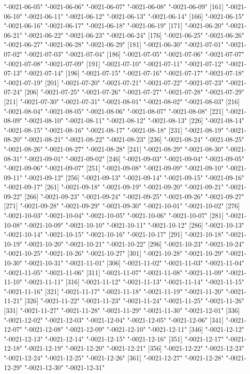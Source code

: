 \documentclass[
]{jss}
\begin{document}
\begin{CodeChunk}
\begin{CodeOutput}
[156] "-0021-06-05" "-0021-06-06" "-0021-06-07" "-0021-06-08" "-0021-06-09"
[161] "-0021-06-10" "-0021-06-11" "-0021-06-12" "-0021-06-13" "-0021-06-14"
[166] "-0021-06-15" "-0021-06-16" "-0021-06-17" "-0021-06-18" "-0021-06-19"
[171] "-0021-06-20" "-0021-06-21" "-0021-06-22" "-0021-06-23" "-0021-06-24"
[176] "-0021-06-25" "-0021-06-26" "-0021-06-27" "-0021-06-28" "-0021-06-29"
[181] "-0021-06-30" "-0021-07-01" "-0021-07-02" "-0021-07-03" "-0021-07-04"
[186] "-0021-07-05" "-0021-07-06" "-0021-07-07" "-0021-07-08" "-0021-07-09"
[191] "-0021-07-10" "-0021-07-11" "-0021-07-12" "-0021-07-13" "-0021-07-14"
[196] "-0021-07-15" "-0021-07-16" "-0021-07-17" "-0021-07-18" "-0021-07-19"
[201] "-0021-07-20" "-0021-07-21" "-0021-07-22" "-0021-07-23" "-0021-07-24"
[206] "-0021-07-25" "-0021-07-26" "-0021-07-27" "-0021-07-28" "-0021-07-29"
[211] "-0021-07-30" "-0021-07-31" "-0021-08-01" "-0021-08-02" "-0021-08-03"
[216] "-0021-08-04" "-0021-08-05" "-0021-08-06" "-0021-08-07" "-0021-08-08"
[221] "-0021-08-09" "-0021-08-10" "-0021-08-11" "-0021-08-12" "-0021-08-13"
[226] "-0021-08-14" "-0021-08-15" "-0021-08-16" "-0021-08-17" "-0021-08-18"
[231] "-0021-08-19" "-0021-08-20" "-0021-08-21" "-0021-08-22" "-0021-08-23"
[236] "-0021-08-24" "-0021-08-25" "-0021-08-26" "-0021-08-27" "-0021-08-28"
[241] "-0021-08-29" "-0021-08-30" "-0021-08-31" "-0021-09-01" "-0021-09-02"
[246] "-0021-09-03" "-0021-09-04" "-0021-09-05" "-0021-09-06" "-0021-09-07"
[251] "-0021-09-08" "-0021-09-09" "-0021-09-10" "-0021-09-11" "-0021-09-12"
[256] "-0021-09-13" "-0021-09-14" "-0021-09-15" "-0021-09-16" "-0021-09-17"
[261] "-0021-09-18" "-0021-09-19" "-0021-09-20" "-0021-09-21" "-0021-09-22"
[266] "-0021-09-23" "-0021-09-24" "-0021-09-25" "-0021-09-26" "-0021-09-27"
[271] "-0021-09-28" "-0021-09-29" "-0021-09-30" "-0021-10-01" "-0021-10-02"
[276] "-0021-10-03" "-0021-10-04" "-0021-10-05" "-0021-10-06" "-0021-10-07"
[281] "-0021-10-08" "-0021-10-09" "-0021-10-10" "-0021-10-11" "-0021-10-12"
[286] "-0021-10-13" "-0021-10-14" "-0021-10-15" "-0021-10-16" "-0021-10-17"
[291] "-0021-10-18" "-0021-10-19" "-0021-10-20" "-0021-10-21" "-0021-10-22"
[296] "-0021-10-23" "-0021-10-24" "-0021-10-25" "-0021-10-26" "-0021-10-27"
[301] "-0021-10-28" "-0021-10-29" "-0021-10-30" "-0021-10-31" "-0021-11-01"
[306] "-0021-11-02" "-0021-11-03" "-0021-11-04" "-0021-11-05" "-0021-11-06"
[311] "-0021-11-07" "-0021-11-08" "-0021-11-09" "-0021-11-10" "-0021-11-11"
[316] "-0021-11-12" "-0021-11-13" "-0021-11-14" "-0021-11-15" "-0021-11-16"
[321] "-0021-11-17" "-0021-11-18" "-0021-11-19" "-0021-11-20" "-0021-11-21"
[326] "-0021-11-22" "-0021-11-23" "-0021-11-24" "-0021-11-25" "-0021-11-26"
[331] "-0021-11-27" "-0021-11-28" "-0021-11-29" "-0021-11-30" "-0021-12-01"
[336] "-0021-12-02" "-0021-12-03" "-0021-12-04" "-0021-12-05" "-0021-12-06"
[341] "-0021-12-07" "-0021-12-08" "-0021-12-09" "-0021-12-10" "-0021-12-11"
[346] "-0021-12-12" "-0021-12-13" "-0021-12-14" "-0021-12-15" "-0021-12-16"
[351] "-0021-12-17" "-0021-12-18" "-0021-12-19" "-0021-12-20" "-0021-12-21"
[356] "-0021-12-22" "-0021-12-23" "-0021-12-24" "-0021-12-25" "-0021-12-26"
[361] "-0021-12-27" "-0021-12-28" "-0021-12-29" "-0021-12-30" "-0021-12-31"
\end{CodeOutput}
\end{CodeChunk}
\end{document}
